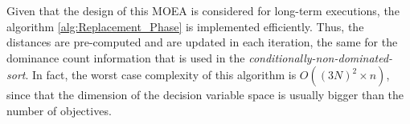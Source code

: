 Given that the design of this MOEA is considered for long-term executions, the algorithm \ref{alg:Replacement_Phase} is implemented efficiently.
%
Thus, the distances are pre-computed and are updated in each iteration, the same for the dominance count information that is used in the \textit{conditionally-non-dominated-sort}.
%
In fact, the worst case complexity of this algorithm is $O((3 N)^2 \times n)$, since that the dimension of the decision variable space is usually bigger than the number of objectives. 
